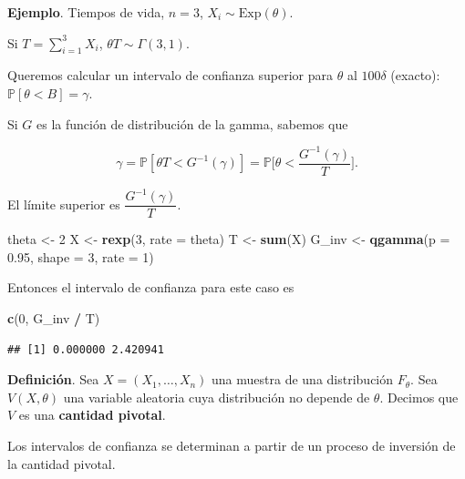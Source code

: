 \documentclass[
  12pt,
]{book}
\newenvironment{Shaded}{\begin{snugshade}}{\end{snugshade}}
\newcommand{\DataTypeTok}[1]{\textcolor[rgb]{0.13,0.29,0.53}{#1}}
\newcommand{\DecValTok}[1]{\textcolor[rgb]{0.00,0.00,0.81}{#1}}
\newcommand{\FloatTok}[1]{\textcolor[rgb]{0.00,0.00,0.81}{#1}}
\newcommand{\KeywordTok}[1]{\textcolor[rgb]{0.13,0.29,0.53}{\textbf{#1}}}
\newcommand{\NormalTok}[1]{#1}
\newcommand{\OperatorTok}[1]{\textcolor[rgb]{0.81,0.36,0.00}{\textbf{#1}}}
\newcommand{\StringTok}[1]{\textcolor[rgb]{0.31,0.60,0.02}{#1}}
\begin{document}
\textbf{Ejemplo}. Tiempos de vida, \(n=3\), \(X_i\sim \text{Exp}(\theta)\).

Si \(T = \sum_{i=1}^3X_i\), \(\theta T\sim \Gamma(3,1)\).

Queremos calcular un intervalo de confianza superior para \(\theta\) al
\(100\delta\) (exacto): \(\mathbb P[\theta<B] = \gamma\).

Si \(G\) es la función de distribución de la gamma, sabemos que

\begin{equation*}
\gamma = \mathbb{P}[\theta T<G^{-1}(\gamma)] = \mathbb{P}\bigg[\theta<\dfrac{G^{-1}(\gamma)}{T}\bigg].
\end{equation*}

El límite superior es \(\dfrac{G^{-1}(\gamma)}{T}\).

\begin{Shaded}
\begin{Highlighting}[]
\NormalTok{theta \textless{}{-}}\StringTok{ }\DecValTok{2}
\NormalTok{X \textless{}{-}}\StringTok{ }\KeywordTok{rexp}\NormalTok{(}\DecValTok{3}\NormalTok{, }\DataTypeTok{rate =}\NormalTok{ theta)}
\NormalTok{T \textless{}{-}}\StringTok{ }\KeywordTok{sum}\NormalTok{(X)}
\NormalTok{G\_inv \textless{}{-}}\StringTok{ }\KeywordTok{qgamma}\NormalTok{(}\DataTypeTok{p =} \FloatTok{0.95}\NormalTok{, }\DataTypeTok{shape =} \DecValTok{3}\NormalTok{, }\DataTypeTok{rate =} \DecValTok{1}\NormalTok{)}
\end{Highlighting}
\end{Shaded}

Entonces el intervalo de confianza para este caso es

\begin{Shaded}
\begin{Highlighting}[]
\KeywordTok{c}\NormalTok{(}\DecValTok{0}\NormalTok{, G\_inv }\OperatorTok{/}\StringTok{ }\NormalTok{T)}
\end{Highlighting}
\end{Shaded}

\begin{verbatim}
## [1] 0.000000 2.420941
\end{verbatim}

\textbf{Definición}. Sea \(X = (X_1,\dots,X_n)\) una muestra de una distribución
\(F_\theta\). Sea \(V(X,\theta)\) una variable aleatoria cuya distribución no
depende de \(\theta\). Decimos que \(V\) es una \textbf{cantidad pivotal}.

Los intervalos de confianza se determinan a partir de un proceso de inversión de
la cantidad pivotal.
\end{document}

